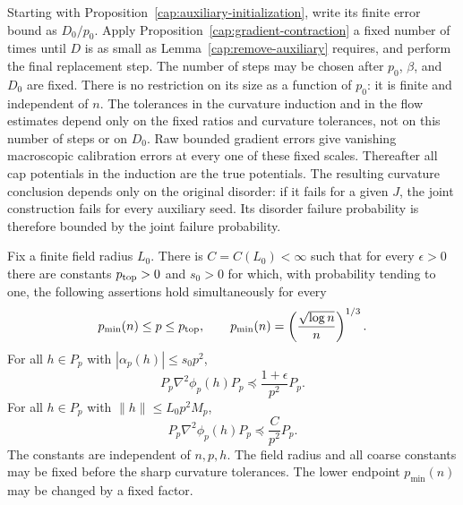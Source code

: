 Starting with Proposition~\ref{cap:auxiliary-initialization}, write its finite
error bound as $D_0/p_0$. Apply Proposition~\ref{cap:gradient-contraction} a
fixed number of times until $D$ is as small as
Lemma~\ref{cap:remove-auxiliary} requires, and perform the final replacement
step. The number of steps may be chosen after $p_0$, $\beta$, and $D_0$ are
fixed. There is no restriction on its size as a function of $p_0$: it is
finite and independent of $n$. The tolerances in the curvature induction and
in the flow estimates depend only on the fixed ratios and curvature
tolerances, not on this number of steps or on $D_0$. Raw bounded gradient
errors give vanishing macroscopic calibration errors at every one of these
fixed scales. Thereafter all cap potentials in the induction are the true
potentials. The resulting curvature conclusion depends only on the original
disorder: if it fails for a given $J$, the joint construction fails for every
auxiliary seed. Its disorder failure probability is therefore bounded by the
joint failure probability.

\begin{theorem}
\label{cap:true-curvature}
Fix a finite field radius $L_0$. There is $C=C(L_0)<\infty$ such that
for every $\epsilon>0$ there are constants $p_{\rm top}>0$ and $s_0>0$
for which, with probability tending to one,
the following assertions hold simultaneously for every
\[
 p_{\min}(n)\le p\le p_{\rm top},\qquad
 p_{\min}(n)=\left(\frac{\sqrt{\log n}}{n}\right)^{1/3}.
\]
For all $h\in P_p$ with $|\alpha_p(h)|\le s_0p^2$,
\begin{equation}\label{cap:true-sharp-curvature}
 P_p\nabla^2\phi_p(h)P_p
       \preceq \frac{1+\epsilon}{p^2}P_p.
\end{equation}
For all $h\in P_p$ with $\|h\|\le L_0p^2M_p$,
\begin{equation}\label{cap:true-ball-curvature}
 P_p\nabla^2\phi_p(h)P_p\preceq\frac C{p^2}P_p.
\end{equation}
The constants are independent of $n,p,h$.  The field
radius and all coarse constants may be fixed before
the sharp curvature tolerances.  The lower endpoint
$p_{\min}(n)$ may be changed by a fixed factor.
\end{theorem}

